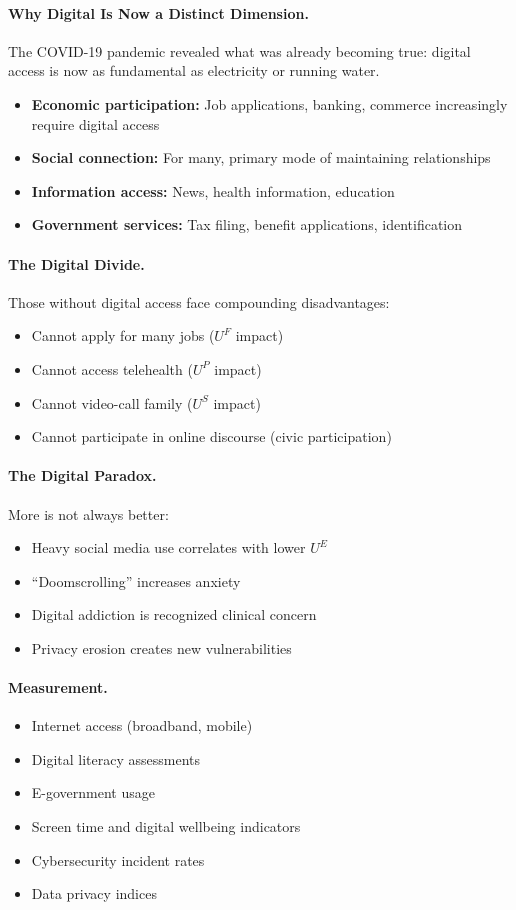\paragraph{Why Digital Is Now a Distinct Dimension.}
The COVID-19 pandemic revealed what was already becoming true:
digital access is now as fundamental as electricity or running water.

\begin{itemize}
\item \textbf{Economic participation:} Job applications, banking, commerce 
increasingly require digital access
\item \textbf{Social connection:} For many, primary mode of maintaining relationships
\item \textbf{Information access:} News, health information, education
\item \textbf{Government services:} Tax filing, benefit applications, identification
\end{itemize}

\paragraph{The Digital Divide.}
Those without digital access face compounding disadvantages:
\begin{itemize}
\item Cannot apply for many jobs ($U^F$ impact)
\item Cannot access telehealth ($U^P$ impact)
\item Cannot video-call family ($U^S$ impact)
\item Cannot participate in online discourse (civic participation)
\end{itemize}

\paragraph{The Digital Paradox.}
More is not always better:
\begin{itemize}
\item Heavy social media use correlates with lower $U^E$ \citep{twenge2018decreases}
\item ``Doomscrolling'' increases anxiety
\item Digital addiction is recognized clinical concern
\item Privacy erosion creates new vulnerabilities
\end{itemize}

\paragraph{Measurement.}
\begin{itemize}
\item Internet access (broadband, mobile)
\item Digital literacy assessments
\item E-government usage
\item Screen time and digital wellbeing indicators
\item Cybersecurity incident rates
\item Data privacy indices
\end{itemize}

